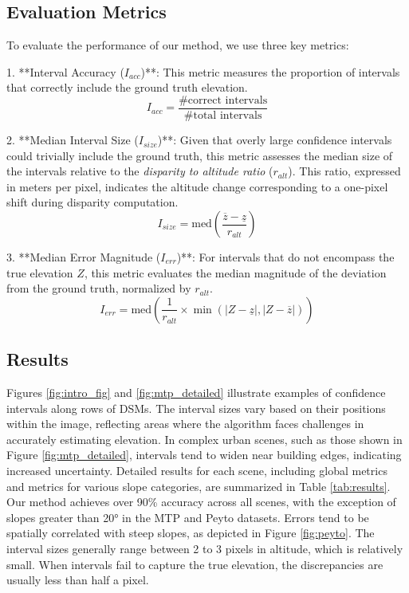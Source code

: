 \subsection{Evaluation Metrics}
To evaluate the performance of our method, we use three key metrics:

1. **Interval Accuracy (\(I_{acc}\))**: This metric measures the proportion of intervals that correctly include the ground truth elevation. 
\begin{equation}
    I_{acc} = \frac{\# \text{correct intervals}}{\# \text{total intervals}}
\end{equation}

2. **Median Interval Size (\(I_{size}\))**: Given that overly large confidence intervals could trivially include the ground truth, this metric assesses the median size of the intervals relative to the \textit{disparity to altitude ratio} (\(r_{alt}\)). This ratio, expressed in meters per pixel, indicates the altitude change corresponding to a one-pixel shift during disparity computation. 
\begin{equation}
    I_{size} = \text{med}\left( \frac{\overline{z} - \underline{z}}{r_{alt}} \right)
\end{equation}

3. **Median Error Magnitude (\(I_{err}\))**: For intervals that do not encompass the true elevation \( Z \), this metric evaluates the median magnitude of the deviation from the ground truth, normalized by \( r_{alt} \). 
\begin{equation}
    I_{err} = \text{med}\left( \frac{1}{r_{alt}} \times \min\left( |Z - \underline{z}|, |Z - \overline{z}| \right) \right)
\end{equation}

\subsection{Results}
Figures \ref{fig:intro_fig} and \ref{fig:mtp_detailed} illustrate examples of confidence intervals along rows of DSMs. The interval sizes vary based on their positions within the image, reflecting areas where the algorithm faces challenges in accurately estimating elevation. In complex urban scenes, such as those shown in Figure \ref{fig:mtp_detailed}, intervals tend to widen near building edges, indicating increased uncertainty. Detailed results for each scene, including global metrics and metrics for various slope categories, are summarized in Table \ref{tab:results}. Our method achieves over 90\% accuracy across all scenes, with the exception of slopes greater than 20° in the MTP and Peyto datasets. Errors tend to be spatially correlated with steep slopes, as depicted in Figure \ref{fig:peyto}. The interval sizes generally range between 2 to 3 pixels in altitude, which is relatively small. When intervals fail to capture the true elevation, the discrepancies are usually less than half a pixel.

